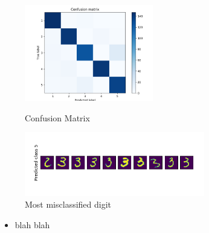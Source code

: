 \documentclass[a4paper]{article}
\begin{document}
\begin{figure}[h]
  \begin{center}
    \includegraphics[width=0.5\textwidth]{3_b_cm.png}
    \caption{Confusion Matrix}
    \includegraphics[width=0.7\textwidth]{3_b_err.png}
    \caption{Most misclassified digit}
  \end{center}
\end{figure}
\begin{itemize}
  \item blah blah
\end{itemize}
\end{document}
